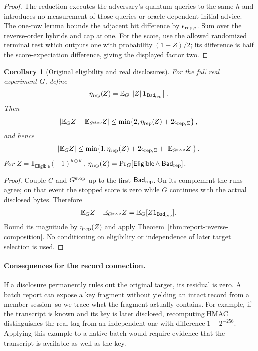 \documentclass[pdflatex]{sn-jnl}
\theoremstyle{thmstyleone}
\newtheorem{corollary}[theorem]{Corollary}
\theoremstyle{thmstylethree}
\theoremstyle{thmstyletwo}
\begin{document}
\begin{proof}
The reduction executes the adversary's quantum queries to the same $h$ and
introduces no measurement of those queries or oracle-dependent initial advice.
The one-row lemma bounds the adjacent bit difference by
$\epsilon_{{\rm rep},i}$.  Sum over the reverse-order hybrids and cap at one.
For the score, use the allowed randomized terminal test which outputs one
with probability $(1+Z)/2$; its difference is half the score-expectation
difference, giving the displayed factor two.
\end{proof}

\begin{corollary}[Original eligibility and real disclosures]
\label{cor:report-exposure-residual}
For the full real experiment $G$, define
\[
 \eta_{\rm rep}(Z)
 =\mathbb E_G\!\left[|Z|\,
                    \mathbf1_{\mathsf{Bad}_{\rm rep}}\right].
\]
Then
\[
 \left|\mathbb E_GZ-\mathbb E_{S^{\rm stop}}Z\right|
 \le\min\!\left\{2,\eta_{\rm rep}(Z)
                       +2\epsilon_{{\rm rep},\Sigma}\right\},
\]
and hence
\[
 |\mathbb E_GZ|
 \le\min\!\left\{1,\eta_{\rm rep}(Z)
       +2\epsilon_{{\rm rep},\Sigma}
       +|\mathbb E_{S^{\rm stop}}Z|\right\}.
\]
For $Z=\mathbf1_{\mathsf{Eligible}}(-1)^{b\oplus b'}$,
$\eta_{\rm rep}(Z)=
\Pr_G[\mathsf{Eligible}\land\mathsf{Bad}_{\rm rep}]$.
\end{corollary}

\begin{proof}
Couple $G$ and $G^{\rm stop}$ up to the first
$\mathsf{Bad}_{\rm rep}$.  On its complement the runs agree; on that event the
stopped score is zero while $G$ continues with the actual disclosed bytes.
Therefore
\[
 \mathbb E_GZ-\mathbb E_{G^{\rm stop}}Z
   =\mathbb E_G[Z\mathbf1_{\mathsf{Bad}_{\rm rep}}].
\]
Bound its magnitude by $\eta_{\rm rep}(Z)$ and apply
Theorem~\ref{thm:report-reverse-composition}.  No conditioning on eligibility
or independence of later target selection is used.
\end{proof}

\paragraph{Consequences for the record connection.}
If a disclosure permanently rules out the original target, its
residual is zero. A batch report can expose a key fragment without
yielding an intact record from a member session, so we trace what the
fragment actually contains. For example, if the transcript is known
and its key is later disclosed, recomputing HMAC distinguishes the
real tag from an independent one with difference $1-2^{-256}$.
Applying this example to a native batch would require evidence that
the transcript is available as well as the key.
\end{document}
